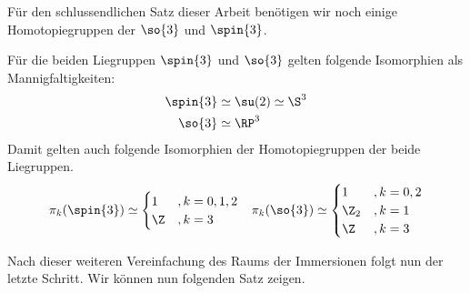 Für den schlussendlichen Satz dieser Arbeit benötigen wir
noch einige Homotopiegruppen der $\so{3}$ und $\spin{3}$.
\begin{Lem}\label{hgroups}
	Für die beiden Liegruppen $\spin{3}$ und $\so{3}$ gelten
	folgende Isomorphien als Mannigfaltigkeiten:
	\begin{align*}
	\spin{3} &\simeq \su(2) \simeq \S^3 \\
	\so{3} &\simeq \RP^3
	\end{align*}
	Damit gelten auch folgende Isomorphien der Homotopiegruppen
	der beide Liegruppen.
	\begin{align*}
	\pi_k(\spin{3}) &\simeq \begin{cases}
	1 & ,k=0,1,2 \\
	\Z & ,k=3
	\end{cases}
	&{\pi_k(\so{3}) \simeq \begin{cases}
		1 & ,k=0,2 \\
		\Z_2 & ,k=1 \\
		\Z & ,k=3
		\end{cases}}
	\end{align*}
\end{Lem}

Nach dieser weiteren Vereinfachung des Raums der Immersionen folgt
nun der letzte Schritt. Wir können nun folgenden Satz zeigen.


